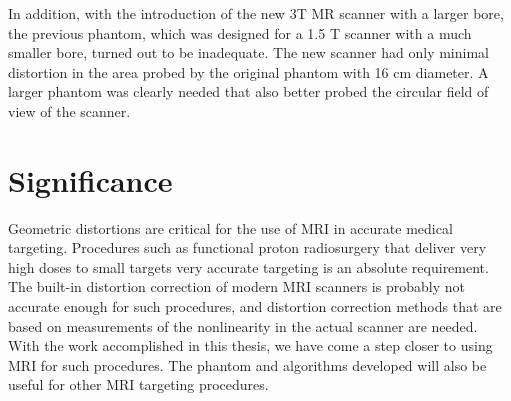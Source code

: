 In addition, with the introduction of the new 3T MR scanner with a larger bore, the previous phantom, which was designed for a 1.5 T scanner with a much smaller bore, turned out to be inadequate. The new scanner had only minimal distortion in the area probed by the original phantom with 16 cm diameter. A larger phantom was clearly needed that also better probed the circular field of view of the scanner.

\section{Significance}

Geometric distortions are critical for the use of MRI in accurate medical targeting. Procedures such as functional proton radiosurgery that deliver very high doses to small targets very accurate targeting is an absolute requirement. The built-in distortion correction of modern MRI scanners is probably not accurate enough for such procedures, and distortion correction methods that are based on measurements of the nonlinearity in the actual scanner are needed. With the work accomplished in this thesis, we have come a step closer to using MRI for such procedures. The phantom and algorithms developed will also be useful for other MRI targeting procedures.





